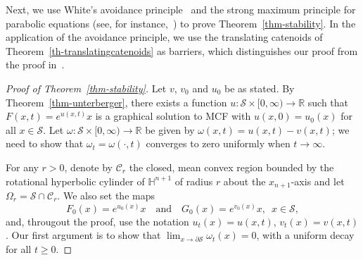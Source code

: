 \documentclass{amsart}[12pt]
\newcommand{\cS}{\mathcal{S}}
\theoremstyle{definition}
\theoremstyle{plain}
\newcommand{\R}{\mathbb{R} }
\newcommand{\h}{\mathbb{H} }
\renewcommand{\Omega}{\varOmega}
\begin{document}
Next, we use
White's avoidance principle~\cite{white}
and the strong maximum principle for parabolic equations (see, for
instance,~\cite[Theorem 2.1.1 and Corollary 2.1.2]{mantegazza})
to prove Theorem~\ref{thm-stability}.
In the application of the avoidance principle,
we use the translating catenoids of
Theorem~\ref{th-translatingcatenoids} as barriers, which distinguishes
our proof from the proof in~\cite{schulze}.





\begin{proof}[Proof of Theorem~\ref{thm-stability}]
Let $v$, $v_0$ and $u_0$ be as stated. By Theorem~\ref{thm-unterberger},
there exists a function
$u\colon \mathcal{S}\times[0,\infty)\to \R$ such that
$F(x,t) = e^{u(x,t)}x$ is a graphical solution to MCF with
$u(x,0) = u_0(x)$ for all $x\in \cS$.
Let $\omega\colon \cS\times[0,\infty)\to \R$ be given by
$\omega(x,t) = u(x,t)-v(x,t)$; we need to show that
$\omega_t = \omega(\cdot,t)$
converges to zero uniformly when $t\to \infty$.

For any $r>0$, denote by $\mathscr C_r$ the closed, mean convex region
bounded by the rotational hyperbolic
cylinder of $\h^{n+1}$ of radius $r$ about the $x_{n+1}$-axis and let
$\Omega_r = \cS \cap \mathscr C_r$.
We also set the maps
$$F_0(x)=e^{u_0(x)}x \quad\text{and}\quad G_0(x)=e^{v_0(x)}x,
\,\,\, x\in\mathcal S,$$
and, througout the proof,
use the notation $u_t(x) = u(x,t)$, $v_t(x) = v(x,t)$.
Our first argument is to show that
$\lim_{x\to \partial \cS}\omega_t(x) = 0$, with a uniform
decay for all $t\geq0$.



\end{proof}
\end{document}
